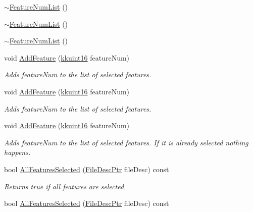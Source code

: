 \begin{DoxyCompactItemize}
\hyperlink{class_k_k_m_l_l_1_1_feature_num_list_a260e73a77294668fa69ffd04bfa5f2a9}{$\sim$\+Feature\+Num\+List} ()
\item 
\hyperlink{class_k_k_m_l_l_1_1_feature_num_list_ace9837b144b7dbbf0f03e75befd487ae}{$\sim$\+Feature\+Num\+List} ()
\item 
\hyperlink{class_k_k_m_l_l_1_1_feature_num_list_a260e73a77294668fa69ffd04bfa5f2a9}{$\sim$\+Feature\+Num\+List} ()
\item 
void \hyperlink{class_k_k_m_l_l_1_1_feature_num_list_af048f88149020f3fb3928b193ab51c44}{Add\+Feature} (\hyperlink{namespace_k_k_b_aa8c7d4d30381c8a0b6fce68974a9c8a9}{kkuint16} feature\+Num)
\begin{DoxyCompactList}\small\item\em Adds \textquotesingle{}feature\+Num\textquotesingle{} to the list of selected features. \end{DoxyCompactList}\item 
void \hyperlink{class_k_k_m_l_l_1_1_feature_num_list_a1d3b119854c90e602cab62ca46cd05cc}{Add\+Feature} (\hyperlink{namespace_k_k_b_aa8c7d4d30381c8a0b6fce68974a9c8a9}{kkuint16} feature\+Num)
\begin{DoxyCompactList}\small\item\em Adds \textquotesingle{}feature\+Num\textquotesingle{} to the list of selected features. \end{DoxyCompactList}\item 
void \hyperlink{class_k_k_m_l_l_1_1_feature_num_list_af048f88149020f3fb3928b193ab51c44}{Add\+Feature} (\hyperlink{namespace_k_k_b_aa8c7d4d30381c8a0b6fce68974a9c8a9}{kkuint16} feature\+Num)
\begin{DoxyCompactList}\small\item\em Adds \textquotesingle{}feature\+Num\textquotesingle{} to the list of selected features. If it is already selected nothing happens. \end{DoxyCompactList}\item 
bool \hyperlink{class_k_k_m_l_l_1_1_feature_num_list_a11f20073677f854dca29af652fd6bc2f}{All\+Features\+Selected} (\hyperlink{namespace_k_k_m_l_l_aa0d0b6ab4ec18868a399b8455b05d914}{File\+Desc\+Ptr} file\+Desc) const 
\begin{DoxyCompactList}\small\item\em Returns true if all features are selected. \end{DoxyCompactList}\item 
bool \hyperlink{class_k_k_m_l_l_1_1_feature_num_list_a550d3102ae8defe33551e3e7141f2732}{All\+Features\+Selected} (\hyperlink{namespace_k_k_m_l_l_aa0d0b6ab4ec18868a399b8455b05d914}{File\+Desc\+Ptr} file\+Desc) const 

\end{DoxyCompactItemize}
